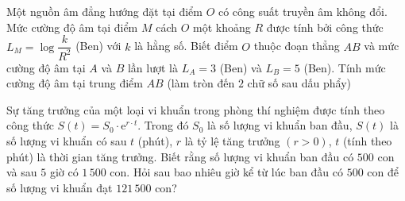 \begin{ex}%
	Một nguồn âm đẳng hướng đặt tại điểm $O$ có công suất truyền âm không đổi. Mức cường độ âm tại điểm $M$ cách $O$ một khoảng $R$ được tính bởi công thức $L_M=\log\dfrac{k}{R^2}$ (Ben) với $k$ là hằng số. Biết điểm $O$ thuộc đoạn thẳng $AB$ và mức  cường độ âm tại $A$ và $B$ lần lượt là $L_A=3$ (Ben) và $L_B=5$ (Ben). Tính mức cường độ âm tại trung điểm $AB$ (làm tròn đến $2$ chữ số sau dấu phẩy)
\end{ex}

\begin{ex}%
	Sự tăng trưởng của một loại vi khuẩn trong phòng thí nghiệm được tính theo công thức $S(t)=S_0\cdot\mathrm{e}^{r\cdot t}$. Trong đó $S_0$ là số lượng vi  khuẩn ban đầu, $S(t)$ là số lượng vi khuẩn có sau $t$ (phút), $r$ là tỷ lệ tăng trưởng $(r>0)$, $t$ (tính theo phút) là thời gian tăng trưởng. Biết rằng số lượng vi khuẩn ban đầu có $500$ con và sau $5$ giờ có $1\,500$ con. Hỏi sau bao nhiêu giờ kể từ lúc ban đầu có $500$ con để số lượng vi khuẩn đạt $121\,500$ con?
\end{ex}

